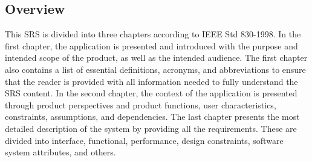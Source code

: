 \subsection{Overview}
This SRS is divided into three chapters according to IEEE Std 830-1998. In the first chapter, the application is presented and introduced with the purpose and intended scope of the product, as well as the intended audience. The first chapter also contains a list of essential definitions, acronyms, and abbreviations to ensure that the reader is provided with all information needed to fully understand the SRS content. In the second chapter, the context of the application is presented through product perspectives and product functions, user characteristics, constraints, assumptions, and dependencies. The last chapter presents the most detailed description of the system by providing all the requirements. These are divided into interface, functional, performance, design constraints, software system attributes, and others. 